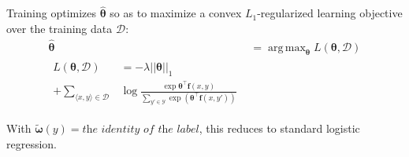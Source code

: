 \documentclass[11pt,letterpaper]{article}
\DeclareMathOperator*{\argmax}{arg\,max}
\newcommand{\ensuretext}[1]{#1}
\newcommand{\nssmarker}{\ensuretext{\textcolor{magenta}{\ensuremath{^{\textsc{NS}}_{\textsc{S}}}}}}
\newcommand{\arkcomment}[3]{\ensuretext{\textcolor{#3}{[#1 #2]}}}
\newcommand{\nss}[1]{\arkcomment{\nssmarker}{#1}{magenta}}
\newcommand{\costversion}[1]{}
\begin{document}
Training optimizes $\hat{\boldsymbol{\theta}}$ so as to maximize a convex $L_1$-regularized
\costversion{\emph{softmax-margin} }learning objective\costversion{ \citep{gimpel}} over the training data $\mathcal{D}$:
\begin{align}
\hat{\boldsymbol{\theta}} &= \argmax_{\boldsymbol{\theta}} L(\boldsymbol{\theta}, \mathcal{D}) \\
\begin{split}
L(\boldsymbol{\theta}, \mathcal{D}) &= -\lambda ||\boldsymbol{\theta}||_1 \\ 
+ \sum_{\langle x,y \rangle\in\mathcal{D}} &\log{\frac{\exp{\boldsymbol{\theta}^{\top}\mathbf{f}(x,y)}}{\sum_{y' \in \mathcal{Y}}\exp{\left(\boldsymbol{\theta}^{\top}\mathbf{f}(x,y')\costversion{ + \kappa\textit{cost}(y,y')}\right)}}}
\end{split}
\end{align}
\costversion{The \emph{cost function} allows us to penalize some errors more than others during training, 
taking into account the linguistic functions of the labels.
It is zero for the gold label and nonnegative for the others.\nss{intuition}

This framework gives us several ways to design a classifier appropriate to the task: 
the attributes, the space of labels $\mathcal{Y}$ to consider, 
and the cost function, and of course, the features themselves.}
With \costversion{$\kappa = 0$, $\mathcal{Y} = \{\textit{gold labels in training}\}$, 
and }$\tilde{\boldsymbol{\omega}}(y) = \textit{the identity of the label}$, 
this reduces to standard logistic regression.
\end{document}
